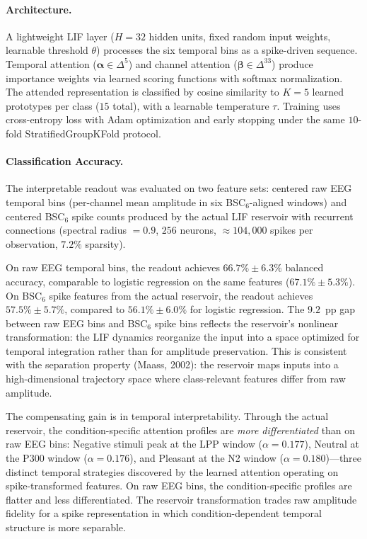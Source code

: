 \paragraph{Architecture.} A lightweight LIF layer ($H = 32$ hidden units, fixed random input weights, learnable threshold $\theta$) processes the six temporal bins as a spike-driven sequence. Temporal attention ($\boldsymbol{\alpha} \in \Delta^5$) and channel attention ($\boldsymbol{\beta} \in \Delta^{33}$) produce importance weights via learned scoring functions with softmax normalization. The attended representation is classified by cosine similarity to $K = 5$ learned prototypes per class ($15$ total), with a learnable temperature $\tau$. Training uses cross-entropy loss with Adam optimization and early stopping under the same $10$-fold StratifiedGroupKFold protocol.

\paragraph{Classification Accuracy.} The interpretable readout was evaluated on two feature sets: centered raw EEG temporal bins (per-channel mean amplitude in six BSC$_6$-aligned windows) and centered BSC$_6$ spike counts produced by the actual LIF reservoir with recurrent connections (spectral radius $= 0.9$, $256$ neurons, $\approx 104{,}000$ spikes per observation, $7.2\%$ sparsity).

On raw EEG temporal bins, the readout achieves $66.7\% \pm 6.3\%$ balanced accuracy, comparable to logistic regression on the same features ($67.1\% \pm 5.3\%$). On BSC$_6$ spike features from the actual reservoir, the readout achieves $57.5\% \pm 5.7\%$, compared to $56.1\% \pm 6.0\%$ for logistic regression. The $9.2$~pp gap between raw EEG bins and BSC$_6$ spike bins reflects the reservoir's nonlinear transformation: the LIF dynamics reorganize the input into a space optimized for temporal integration rather than for amplitude preservation. This is consistent with the separation property (Maass, 2002): the reservoir maps inputs into a high-dimensional trajectory space where class-relevant features differ from raw amplitude.

The compensating gain is in temporal interpretability. Through the actual reservoir, the condition-specific attention profiles are \emph{more differentiated} than on raw EEG bins: Negative stimuli peak at the LPP window ($\alpha = 0.177$), Neutral at the P300 window ($\alpha = 0.176$), and Pleasant at the N2 window ($\alpha = 0.180$)---three distinct temporal strategies discovered by the learned attention operating on spike-transformed features. On raw EEG bins, the condition-specific profiles are flatter and less differentiated. The reservoir transformation trades raw amplitude fidelity for a spike representation in which condition-dependent temporal structure is more separable.

